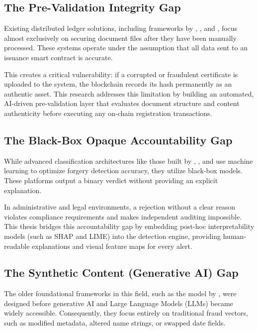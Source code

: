 \subsection{The Pre-Validation Integrity Gap}
Existing distributed ledger solutions, including frameworks by \cite{leka2021development}, \cite{maestre2023application}, and \cite{almansoori2024multichain}, focus almost exclusively on securing document files after they have been manually processed. These systems operate under the assumption that all data sent to an issuance smart contract is accurate. 

This creates a critical vulnerability: if a corrupted or fraudulent certificate is uploaded to the system, the blockchain records its hash permanently as an authentic asset. This research addresses this limitation by building an automated, AI-driven pre-validation layer that evaluates document structure and content authenticity before executing any on-chain registration transactions.

\subsection{The Black-Box Opaque Accountability Gap}
While advanced classification architectures like those built by  \cite{rai2024validify}, \cite{wiputra2024harnessing}, and \cite{karam2024automated} use machine learning to optimize forgery detection accuracy, they utilize black-box models. These platforms output a binary verdict without providing an explicit explanation. 

In administrative and legal environments, a rejection without a clear reason violates compliance requirements and makes independent auditing impossible. This thesis bridges this accountability gap by embedding post-hoc interpretability models (such as SHAP and LIME) into the detection engine, providing human-readable explanations and visual feature maps for every alert.

\subsection{The Synthetic Content (Generative AI) Gap}
The older foundational frameworks in this field, such as the model by \cite{meyliana2020education}, were designed before generative AI and Large Language Models (LLMs) became widely accessible. Consequently, they focus entirely on traditional fraud vectors, such as modified metadata, altered name strings, or swapped date fields. 

